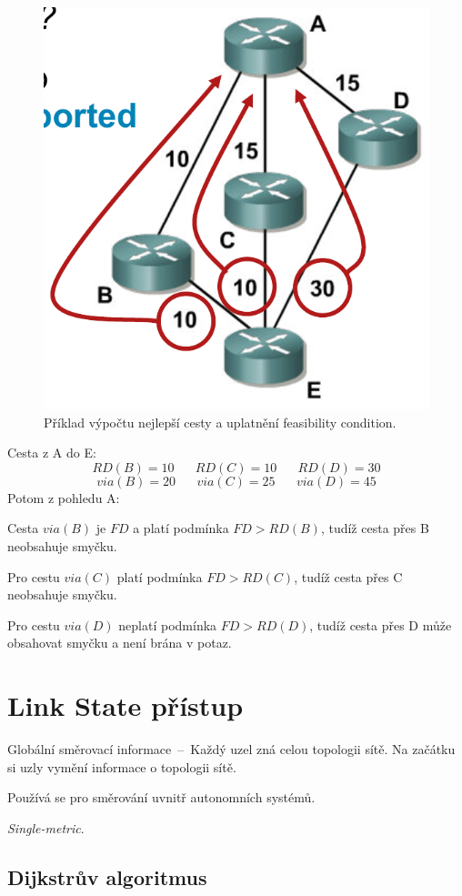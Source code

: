 \begin{figure}[H]
    \centering
    \includegraphics[width=0.4\linewidth]{feasibility_condition.pdf}
    \caption{Příklad výpočtu nejlepší cesty a uplatnění feasibility condition.}
\end{figure}

\noindent Cesta z A do E:
$$
RD(B) = 10 \;\;\;\;\;\;
RD(C) = 10 \;\;\;\;\;\;
RD(D) = 30
$$
$$
via(B) = 20 \;\;\;\;\;\;
via(C) = 25 \;\;\;\;\;\;
via(D) = 45
$$
Potom z pohledu A: \begin{compactitem}
    \item Cesta $via(B)$ je $FD$ a platí podmínka $FD > RD(B)$, tudíž cesta přes B neobsahuje smyčku.
    \item Pro cestu $via(C)$ platí podmínka $FD > RD(C)$, tudíž cesta přes C neobsahuje smyčku.
    \item Pro cestu $via(D)$ neplatí podmínka $FD > RD(D)$, tudíž cesta přes D může obsahovat smyčku a není brána v potaz.
\end{compactitem}


\section{Link State přístup}

\begin{compactitem}
    \item Globální směrovací informace~--~Každý uzel zná celou topologii sítě. Na začátku si uzly vymění informace o topologii sítě.
    \item Používá se pro směrování uvnitř autonomních systémů.
    \item \textit{Single-metric}.
\end{compactitem}

\subsection*{Dijkstrův algoritmus}

